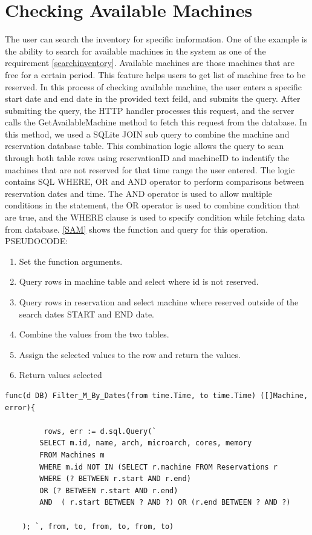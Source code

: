 \section*{Checking Available Machines}
The user can search the inventory for specific imformation. One of the example is the ability to search for available machines in the system as one of the requirement \ref{searchinventory}. Available machines are those machines that are free for a certain period. This feature helps users to get list of machine free to be reserved. In this process of checking available machine, the user enters a specific start date and end date in the provided text feild, and submits the query. After submiting the query, the HTTP handler processes this request, and the server calls the GetAvailableMachine method to fetch this request from the database. In this method, we used a SQLite JOIN sub query to combine the machine and reservation database table. This combination logic allows the query to scan through both table rows using reservationID and machineID to indentify the machines that are not reserved for that time range the user entered. The logic contains SQL WHERE, OR and AND operator to perform comparisons between reservation dates and time. \cite{ANDOR}The AND operator is used to allow multiple conditions in the statement,  the OR operator is used to combine condition that are true, and the WHERE clause is used to specify condition while fetching data from database\cite{WHEREclause}. 
\autoref{SAM} shows the function and query for this operation.
PSEUDOCODE:
\begin{enumerate}
\item Set the function arguments.
\item Query rows in machine table and select where id is not reserved.
\item Query rows in reservation and select machine where reserved outside of the search dates START and END date. 
\item Combine the values from the two tables.
\item Assign the selected values to the row and return the values.
\item Return values selected 
\end{enumerate}

\begin{lstlisting}[caption=Searching available, label=SAM]
func(d DB) Filter_M_By_Dates(from time.Time, to time.Time) ([]Machine, error){

         rows, err := d.sql.Query(`
		SELECT m.id, name, arch, microarch, cores, memory
		FROM Machines m
		WHERE m.id NOT IN (SELECT r.machine FROM Reservations r
		WHERE (? BETWEEN r.start AND r.end)
		OR (? BETWEEN r.start AND r.end)
		AND  ( r.start BETWEEN ? AND ?) OR (r.end BETWEEN ? AND ?)
	
	); `, from, to, from, to, from, to)
\end{lstlisting}
